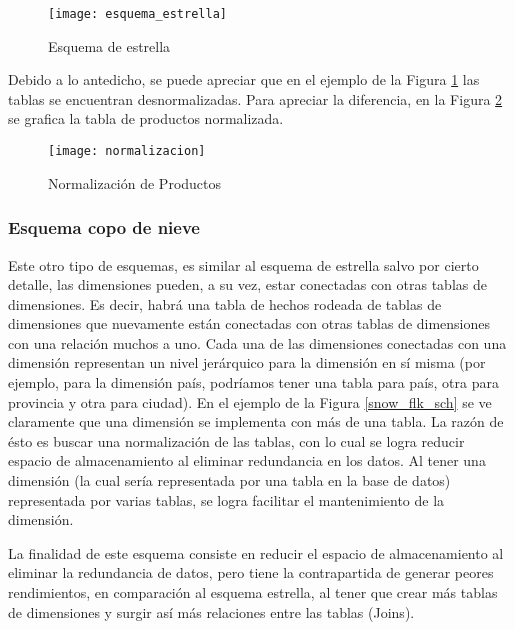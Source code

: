 \documentclass[a4paper,11pt]{article}
\begin{document}
\begin{flushleft}
    \begin{figure}
      \begin{center}
        \texttt{[image: esquema\_estrella]}
        \caption{Esquema de estrella} \cite{dim_models}
        \label{star_sch}
      \end{center}
    \end{figure}
    
    
    Debido a lo antedicho, se puede apreciar que en el ejemplo de la Figura \ref{star_sch} las tablas se encuentran desnormalizadas. Para apreciar la
    diferencia, en la Figura \ref{normalizado} se grafica la tabla de productos normalizada.
    
    \begin{figure}
      \begin{center}
        \texttt{[image: normalizacion]}
        \caption{Normalización de Productos} \cite{dim_models}
        \label{normalizado}
      \end{center}
    \end{figure}
    
    
    \subsubsection{Esquema copo de nieve}
    
    Este otro tipo de esquemas, es similar al esquema de estrella salvo por cierto detalle, las dimensiones pueden, a su vez, estar conectadas con otras 
    tablas de dimensiones. Es decir, habrá una tabla de hechos rodeada de tablas de dimensiones que nuevamente están conectadas con otras tablas de 
    dimensiones con una relación muchos a uno. Cada una de las dimensiones conectadas con una dimensión representan un nivel jerárquico para la dimensión en 
    sí misma (por ejemplo, para la dimensión país, podríamos tener una tabla para país, otra para provincia y otra para ciudad). En el ejemplo de la Figura 
    \ref{snow_flk_sch} se ve claramente que una dimensión se implementa con más de una tabla. La razón de ésto es buscar una normalización de las tablas, con 
    lo cual se logra reducir espacio de almacenamiento al eliminar redundancia en los datos. Al tener una dimensión (la cual sería representada por una tabla 
    en la base de datos) representada por varias tablas, se logra facilitar el mantenimiento de la dimensión.\par
    
    La finalidad de este esquema consiste en reducir el espacio de almacenamiento al eliminar la redundancia de datos, pero tiene la contrapartida de generar
    peores rendimientos, en comparación al esquema estrella, al tener que crear más tablas de dimensiones y surgir así más relaciones entre las tablas 
    (Joins).
    

\end{flushleft}
\end{document}
